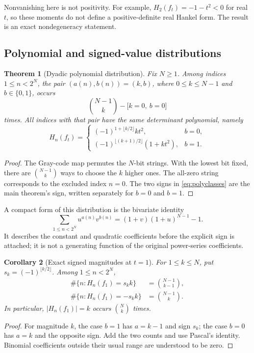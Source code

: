 \documentclass[11pt,a4paper]{article}
\numberwithin{equation}{section}
\newtheorem{theorem}{Theorem}[section]
\newtheorem{corollary}[theorem]{Corollary}
\theoremstyle{definition}
\theoremstyle{remark}
\newcommand{\ind}[1]{\boldsymbol{[}#1\boldsymbol{]}}
\begin{document}
Nonvanishing here is not positivity. For example,
$H_2(f_t)=-1-t^2<0$ for real $t$, so these moments do not define a
positive-definite real Hankel form. The result is an exact
nondegeneracy statement.

\subsection{Polynomial and signed-value distributions}

\begin{theorem}[Dyadic polynomial distribution]\label{thm:distribution}
Fix $N\ge1$. Among indices $1\le n<2^N$, the pair $(a(n),b(n))=(k,b)$,
where $0\le k\le N-1$ and $b\in\{0,1\}$, occurs
\begin{equation}\label{eq:distribution}
 \binom{N-1}{k}-\ind{k=0,\ b=0}
\end{equation}
times. All indices with that pair have the same determinant polynomial,
namely
\begin{equation}\label{eq:polyclasses}
 H_n(f_t)=
 \begin{cases}
 (-1)^{1+\lfloor k/2\rfloor}k t^2,&b=0,\\
 (-1)^{\lfloor(k+1)/2\rfloor}(1+k t^2),&b=1.
 \end{cases}
\end{equation}
\end{theorem}
\begin{proof}
The Gray-code map permutes the $N$-bit strings. With the lowest bit
fixed, there are $\binom{N-1}{k}$ ways to choose the $k$ higher ones.
The all-zero string corresponds to the excluded index $n=0$.
The two signs in \eqref{eq:polyclasses} are the main theorem's sign,
written separately for $b=0$ and $b=1$.
\end{proof}

A compact form of this distribution is the bivariate identity
\begin{equation}\label{eq:distributiongf}
 \sum_{1\le n<2^N}u^{a(n)}v^{b(n)}
 =(1+v)(1+u)^{N-1}-1.
\end{equation}
It describes the constant and quadratic coefficients before the
explicit sign is attached; it is not a generating function of the
original power-series coefficients.

\begin{corollary}[Exact signed magnitudes at $t=1$]\label{cor:signeddist}
For $1\le k\le N$, put $s_k=(-1)^{\lfloor k/2\rfloor}$. Among
$1\le n<2^N$,
\begin{align}
 \#\{n:H_n(f_1)=s_k k\}&=\binom{N-1}{k-1},\label{eq:positivecount}\\
 \#\{n:H_n(f_1)=-s_k k\}&=\binom{N-1}{k}.\label{eq:negativecount}
\end{align}
In particular, $|H_n(f_1)|=k$ occurs $\binom Nk$ times.
\end{corollary}
\begin{proof}
For magnitude $k$, the case $b=1$ has $a=k-1$ and sign $s_k$;
the case $b=0$ has $a=k$ and the opposite sign. Add the two counts and
use Pascal's identity. Binomial coefficients outside their usual
range are understood to be zero.
\end{proof}
\end{document}
